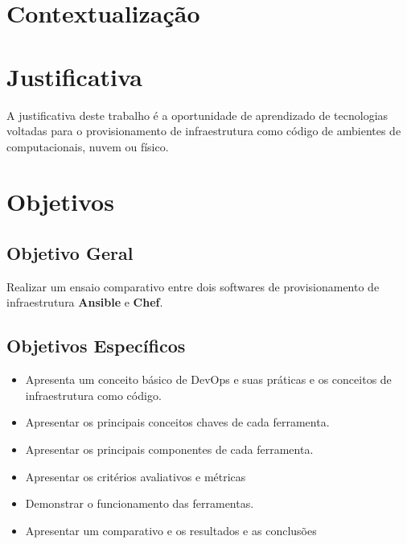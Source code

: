 \section{\esp Contextualização}

\section{\esp Justificativa}
A justificativa deste trabalho é a oportunidade de aprendizado de tecnologias voltadas para o provisionamento de infraestrutura como código de ambientes de computacionais, nuvem ou físico.  

\section{\esp Objetivos}
\subsection{\esp Objetivo Geral}

Realizar um ensaio comparativo entre dois softwares de provisionamento de infraestrutura \textbf{Ansible} e \textbf{Chef}.

\subsection{\esp Objetivos Específicos}
\begin{itemize}
\item Apresenta um conceito básico de DevOps e suas práticas e os conceitos de infraestrutura como código.
\item Apresentar os principais conceitos chaves de cada ferramenta.
\item Apresentar os principais componentes de cada ferramenta.
\item Apresentar os critérios avaliativos e  métricas
\item Demonstrar o funcionamento das ferramentas.
\item Apresentar um comparativo e os resultados e as conclusões 
\end{itemize}

